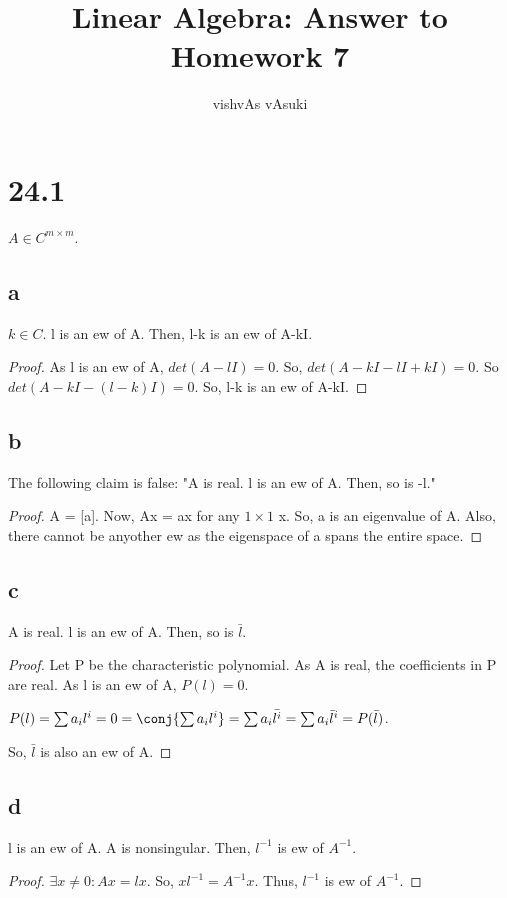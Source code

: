 \documentclass[10pt]{amsart}
\title{Linear Algebra: Answer to Homework 7}
\author{vishvAs vAsuki}
\begin{document}
\maketitle

\section{24.1}
$A \in C^{m \times m}$.

\subsection{a}
\begin{thm}
$k \in C$. l is an ew of A. Then, l-k is an ew of A-kI.
\end{thm}
\begin{proof}
As l is an ew of A, $det(A-lI) = 0$. So, $det(A-kI-lI+kI) = 0$. So $det(A-kI-(l-k)I) = 0$. So, l-k is an ew of A-kI.
\end{proof}

\subsection{b}
\begin{thm}
The following claim is false:
"A is real. l is an ew of A. Then, so is -l."
\end{thm}
\begin{proof}
A = [a]. Now, Ax = ax for any $1 \times 1$ x. So, a is an eigenvalue of A. Also, there cannot be anyother ew as the eigenspace of a spans the entire space.
\end{proof}

\subsection{c}
\begin{thm}
A is real. l is an ew of A. Then, so is $\bar{l}$.
\end{thm}
\begin{proof}
Let P be the characteristic polynomial. As A is real, the coefficients in P are real. As l is an ew of A, $P(l) = 0$.

$P(l) = \sum a_{i}l^{i} = 0 = \conj{\sum a_{i}l^{i}} = \sum a_{i}\bar{l^{i}}= \sum a_{i}\bar{l}^{i} = P(\bar{l})$.

So, $\bar{l}$ is also an ew of A.
\end{proof}

\subsection{d}
\begin{thm}
l is an ew of A. A is nonsingular. Then, $l^{-1}$ is ew of $A^{-1}$.
\end{thm}
\begin{proof}
$\exists x \neq 0: Ax = lx$. So, $x l^{-1} = A^{-1}x$. Thus, $l^{-1}$ is ew of $A^{-1}$.
\end{proof}
\end{document}

